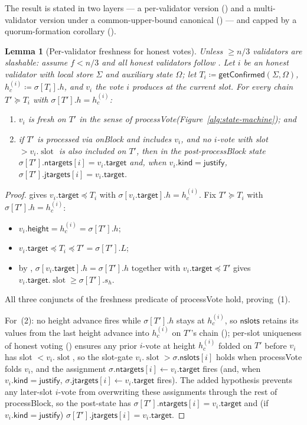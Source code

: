 \documentclass{article}
\newcommand{\slot}[0]{\ensuremath{\operatorname{\mathrm{slot}}}}
\newcommand{\target}{\mathsf{target}}
\newcommand{\kind}{\mathsf{kind}}
\newcommand{\height}{\mathsf{height}}
\newcommand{\just}{\ensuremath{\mathsf{justify}}\xspace}
\newcommand{\jtargets}{\mathsf{jtargets}}
\newcommand{\ntargets}{\mathsf{ntargets}}
\newcommand{\nslots}{\mathsf{nslots}}
\newcommand{\processBlock}{\textsf{processBlock}\xspace}
\newcommand{\processVote}{\textsf{processVote}\xspace}
\newcommand{\onBlock}{\textsf{onBlock}\xspace}
\newcommand{\getConfirmed}{\textsf{getConfirmed}\xspace}
\theoremstyle{plain}
\newtheorem{lemma}{Lemma}
\theoremstyle{definition}
\theoremstyle{remark}
\begin{document}
The result is stated in two layers --- a per-validator version () and a multi-validator version under a common-upper-bound canonical () --- and capped by a quorum-formation corollary ().

\begin{lemma}[Per-validator freshness for honest votes]\label{lem:freshness-honest-local}
Unless $\geq n/3$ validators are slashable: assume $f < n/3$ and all honest validators follow .
Let $i$ be an honest validator with local store $\Sigma$ and auxiliary state $\Omega$; let $T_i \coloneqq \getConfirmed(\Sigma, \Omega)$, $h_c^{(i)} \coloneqq \sigma[T_i].h$, and $v_i$ the vote $i$ produces at the current slot.
For every chain $T' \succeq T_i$ with $\sigma[T'].h = h_c^{(i)}$:
\begin{enumerate}
  \item $v_i$ is fresh on $T'$ in the sense of \processVote (Figure~\ref{alg:state-machine}); and
  \item if $T'$ is processed via \onBlock and includes $v_i$, and no $i$-vote with slot $> v_i.\slot$ is also included on $T'$, then in the post-\processBlock state $\sigma[T'].\ntargets[i] = v_i.\target$ and, when $v_i.\kind = \just$, $\sigma[T'].\jtargets[i] = v_i.\target$.
\end{enumerate}
\end{lemma}

\begin{proof}
 gives $v_i.\target \preceq T_i$ with $\sigma[v_i.\target].h = h_c^{(i)}$.
Fix $T' \succeq T_i$ with $\sigma[T'].h = h_c^{(i)}$:
\begin{itemize}
  \item $v_i.\height = h_c^{(i)} = \sigma[T'].h$;
  \item $v_i.\target \preceq T_i \preceq T' = \sigma[T'].L$;
  \item by , $\sigma[v_i.\target].h = \sigma[T'].h$ together with $v_i.\target \preceq T'$ gives $v_i.\target.\slot \geq \sigma[T'].s_h$.
\end{itemize}
All three conjuncts of the freshness predicate of \processVote hold, proving~(1).

For~(2): no height advance fires while $\sigma[T'].h$ stays at $h_c^{(i)}$, so $\nslots$ retains its values from the last height advance into $h_c^{(i)}$ on $T'$'s chain (); per-slot uniqueness of honest voting () ensures any prior $i$-vote at height $h_c^{(i)}$ folded on $T'$ before $v_i$ has slot $< v_i.\slot$, so the slot-gate $v_i.\slot > \sigma.\nslots[i]$ holds when \processVote folds $v_i$, and the assignment $\sigma.\ntargets[i] \gets v_i.\target$ fires (and, when $v_i.\kind = \just$, $\sigma.\jtargets[i] \gets v_i.\target$ fires).
The added hypothesis prevents any later-slot $i$-vote from overwriting these assignments through the rest of \processBlock, so the post-state has $\sigma[T'].\ntargets[i] = v_i.\target$ and (if $v_i.\kind = \just$) $\sigma[T'].\jtargets[i] = v_i.\target$.
\end{proof}
\end{document}

